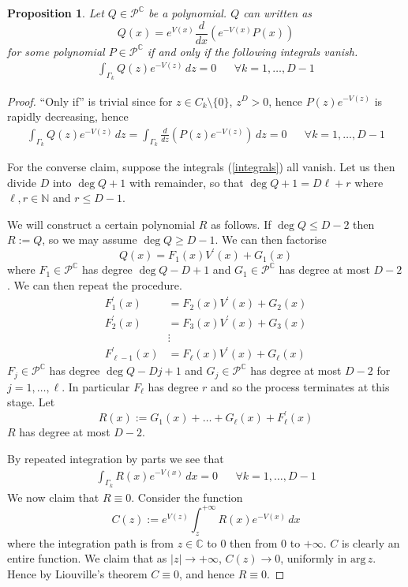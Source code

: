 \documentclass[12pt]{article}
\newtheorem{proposition}[theorem]{Proposition}
\theoremstyle{definition}
\begin{document}
\begin{proposition}\label{representation} Let $Q \in \mathscr{P}^\mathbb{C}$ be a polynomial.  $Q$ can written as
$$Q(x) = e^{V(x)} \frac{d}{dx}\left(e^{-V(x)} P(x) \right)$$
for some polynomial $P \in \mathscr{P}^\mathbb{C}$ if and only if the following integrals vanish.
\begin{align}\label{integrals}
\int_{\Gamma_k} Q(z)e^{-V(z)} \, dz = 0 & & \forall k=1, \dots, D-1
\end{align}
\end{proposition}
\begin{proof}
\enquote{Only if} is trivial since for $z \in C_k \setminus \{ 0 \}$, $z^{D} > 0$, hence $P(z)e^{-V(z)}$ is rapidly decreasing, hence
\begin{align*}
\int_{\Gamma_k} Q(z)e^{-V(z)} \, dz = \int_{\Gamma_k} \frac{d}{dz}\left(P(z)e^{-V(z)}\right) \, dz =0  &  & \forall k = 1, \dots , D-1
\end{align*}

For the converse claim,  suppose the integrals (\ref{integrals}) all vanish.  Let us then divide $D$ into $\deg Q+1$ with remainder, so that $\deg Q+1 = D \ell + r$ where $\ell , r \in \mathbb{N}$ and $r \leq D-1$. 

We will construct a certain polynomial $R$ as follows. If $\deg Q \leq D-2$ then $R:=Q$, so we may assume $\deg Q \geq D-1$.  We can then factorise
$$Q(x) = F_1 (x) V^\prime(x) + G_1(x)$$
where $F_1 \in \mathscr{P}^\mathbb{C}$ has degree $\deg Q - D+1$ and $G_1 \in \mathscr{P}^\mathbb{C}$ has degree at most $D-2$.  We can then repeat the procedure.
\begin{align*}
F_1^\prime(x) &= F_2(x) V^\prime(x) + G_2(x) \\
F_2^\prime(x) &= F_3(x) V^\prime(x) + G_3(x) \\
&\vdots \\
F_{\ell-1}^\prime(x) &= F_{\ell}(x) V^\prime(x) + G_{\ell}(x)
\end{align*}
$F_j \in \mathscr{P}^\mathbb{C}$ has degree $\deg Q-Dj+1$ and $G_j \in \mathscr{P}^\mathbb{C}$ has degree at most $D-2$ for $j=1, \dots , \ell$.  In particular $F_\ell$ has degree $r$ and so the process terminates at this stage.  Let $$R(x) := G_1(x) + \dots + G_\ell(x) + F_\ell^\prime(x)$$ $R$ has degree at most $D-2$. 

By repeated integration by parts we see that
\begin{align*}
\int_{\Gamma_k} R(x) e^{-V(x)} \, dx = 0 & & \forall k = 1, \dots, D-1
\end{align*}
We now claim that $R \equiv 0$. Consider the function
$$C(z) := e^{V(z)}\int_z^{+\infty} R(x) e^{-V(x)} \, dx $$
where the integration path is from $z \in \mathbb{C}$ to $0$ then from $0$ to $+\infty$. $C$ is clearly an entire function. We claim that as $|z| \to +\infty$, $C(z) \to 0$, uniformly in $\mathrm{arg} \, z $.  Hence by Liouville's theorem $C \equiv 0$, and hence $R \equiv 0$.


\end{proof}
\end{document}
